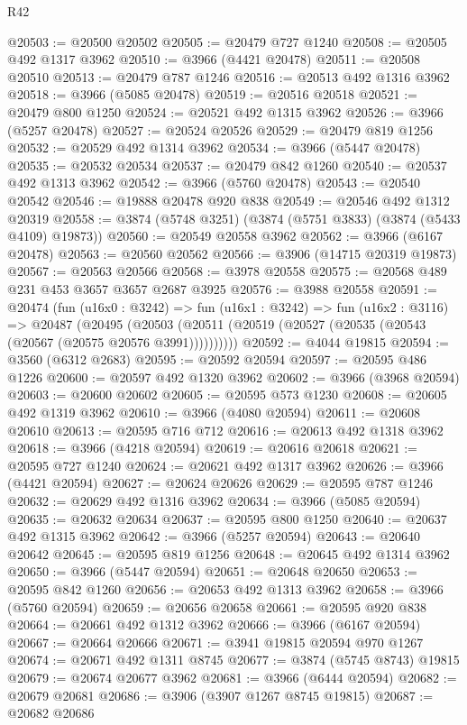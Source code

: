 \begin{lexlean}{R42}
\begin{coremodule}
@20503 := @20500 @20502
@20505 := @20479 @727 @1240
@20508 := @20505 @492 @1317 @3962
@20510 := @3966 (@4421 @20478)
@20511 := @20508 @20510
@20513 := @20479 @787 @1246
@20516 := @20513 @492 @1316 @3962
@20518 := @3966 (@5085 @20478)
@20519 := @20516 @20518
@20521 := @20479 @800 @1250
@20524 := @20521 @492 @1315 @3962
@20526 := @3966 (@5257 @20478)
@20527 := @20524 @20526
@20529 := @20479 @819 @1256
@20532 := @20529 @492 @1314 @3962
@20534 := @3966 (@5447 @20478)
@20535 := @20532 @20534
@20537 := @20479 @842 @1260
@20540 := @20537 @492 @1313 @3962
@20542 := @3966 (@5760 @20478)
@20543 := @20540 @20542
@20546 := @19888 @20478 @920 @838
@20549 := @20546 @492 @1312 @20319
@20558 := @3874 (@5748 @3251) (@3874 (@5751 @3833) (@3874 (@5433 @4109) @19873))
@20560 := @20549 @20558 @3962
@20562 := @3966 (@6167 @20478)
@20563 := @20560 @20562
@20566 := @3906 (@14715 @20319 @19873)
@20567 := @20563 @20566
@20568 := @3978 @20558
@20575 := @20568 @489 @231 @453 @3657 @3657 @2687 @3925
@20576 := @3988 @20558
@20591 := @20474
    (fun (u16x0 : @3242) =>
    fun (u16x1 : @3242) =>
    fun (u16x2 : @3116) =>
    @20487
      (@20495 (@20503 (@20511 (@20519 (@20527 (@20535 (@20543 (@20567 (@20575 @20576 @3991))))))))))
@20592 := @4044 @19815
@20594 := @3560 (@6312 @2683)
@20595 := @20592 @20594
@20597 := @20595 @486 @1226
@20600 := @20597 @492 @1320 @3962
@20602 := @3966 (@3968 @20594)
@20603 := @20600 @20602
@20605 := @20595 @573 @1230
@20608 := @20605 @492 @1319 @3962
@20610 := @3966 (@4080 @20594)
@20611 := @20608 @20610
@20613 := @20595 @716 @712
@20616 := @20613 @492 @1318 @3962
@20618 := @3966 (@4218 @20594)
@20619 := @20616 @20618
@20621 := @20595 @727 @1240
@20624 := @20621 @492 @1317 @3962
@20626 := @3966 (@4421 @20594)
@20627 := @20624 @20626
@20629 := @20595 @787 @1246
@20632 := @20629 @492 @1316 @3962
@20634 := @3966 (@5085 @20594)
@20635 := @20632 @20634
@20637 := @20595 @800 @1250
@20640 := @20637 @492 @1315 @3962
@20642 := @3966 (@5257 @20594)
@20643 := @20640 @20642
@20645 := @20595 @819 @1256
@20648 := @20645 @492 @1314 @3962
@20650 := @3966 (@5447 @20594)
@20651 := @20648 @20650
@20653 := @20595 @842 @1260
@20656 := @20653 @492 @1313 @3962
@20658 := @3966 (@5760 @20594)
@20659 := @20656 @20658
@20661 := @20595 @920 @838
@20664 := @20661 @492 @1312 @3962
@20666 := @3966 (@6167 @20594)
@20667 := @20664 @20666
@20671 := @3941 @19815 @20594 @970 @1267
@20674 := @20671 @492 @1311 @8745
@20677 := @3874 (@5745 @8743) @19815
@20679 := @20674 @20677 @3962
@20681 := @3966 (@6444 @20594)
@20682 := @20679 @20681
@20686 := @3906 (@3907 @1267 @8745 @19815)
@20687 := @20682 @20686

\end{coremodule}
\end{lexlean}
